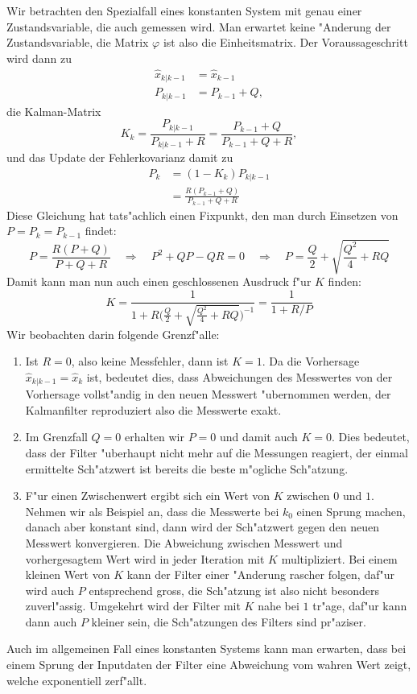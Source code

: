 Wir betrachten den Spezialfall eines konstanten System mit genau einer
Zustandsvariable,
die auch gemessen wird. Man erwartet keine "Anderung der Zustandsvariable,
die Matrix $\varphi$ ist also die Einheitsmatrix. Der Voraussageschritt wird
dann zu 
\begin{align*}
\hat x_{k|k-1}&=\hat x_{k-1}\\
P_{k|k-1}&=P_{k-1}+Q,
\end{align*}
die Kalman-Matrix 
\[
K_{k}=\frac{P_{k|k-1}}{P_{k|k-1}+R}=\frac{P_{k-1}+Q}{P_{k-1}+Q+R},
\]
und das Update der Fehlerkovarianz damit zu
\begin{align*}
P_k&=(1-K_k)P_{k|k-1}\\
&=\frac{R(P_{k-1}+Q)}{P_{k-1}+Q+R}
\end{align*}
Diese Gleichung hat tats"achlich einen Fixpunkt, den man durch
Einsetzen von $P=P_k=P_{k-1}$ findet:
\[
P=\frac{R(P+Q)}{P+Q+R}
\quad\Rightarrow\quad
P^2+QP-QR=0
\quad\Rightarrow\quad
P=\frac{Q}2+\sqrt{\frac{Q^2}4+RQ}
\]
Damit kann man nun auch einen geschlossenen Ausdruck f"ur $K$
finden:
\[
K=\frac{1}{1+R\biggl(\displaystyle\frac{Q}2+\sqrt{\frac{Q^2}4+RQ}\biggr)^{-1}}
=\frac1{1+R/P}
\]
Wir beobachten darin folgende Grenzf"alle:
\begin{enumerate}
\item Ist $R=0$, also keine Messfehler, dann ist $K=1$. Da die Vorhersage
$\hat x_{k|k-1}=\hat x_k$ ist, bedeutet dies, dass Abweichungen des Messwertes
von der Vorhersage vollst"andig in den neuen Messwert "ubernommen werden,
der Kalmanfilter reproduziert also die Messwerte exakt.
\item Im Grenzfall $Q=0$ erhalten wir $P=0$ und damit auch $K=0$. Dies
bedeutet, dass der Filter "uberhaupt nicht mehr auf die Messungen reagiert,
der einmal ermittelte Sch"atzwert ist bereits die beste m"ogliche Sch"atzung.
\item F"ur einen Zwischenwert ergibt sich ein Wert von $K$ zwischen $0$ und $1$.
Nehmen wir als Beispiel an, dass die Messwerte bei $k_0$ einen Sprung machen,
danach aber konstant sind, dann wird der Sch"atzwert gegen den neuen Messwert
konvergieren. Die Abweichung zwischen Messwert und vorhergesagtem Wert wird
in jeder Iteration mit $K$ multipliziert. Bei einem kleinen Wert von $K$
kann der Filter einer "Anderung rascher folgen, daf"ur wird auch $P$ entsprechend
gross, die Sch"atzung ist also nicht besonders zuverl"assig.
Umgekehrt wird der Filter mit $K$ nahe bei $1$ tr"age, daf"ur kann dann auch
$P$ kleiner sein, die Sch"atzungen des Filters sind pr"aziser.
\end{enumerate}
Auch im allgemeinen Fall eines konstanten Systems kann man erwarten,
dass bei einem Sprung der Inputdaten der Filter eine Abweichung vom
wahren Wert zeigt, welche exponentiell zerf"allt.

